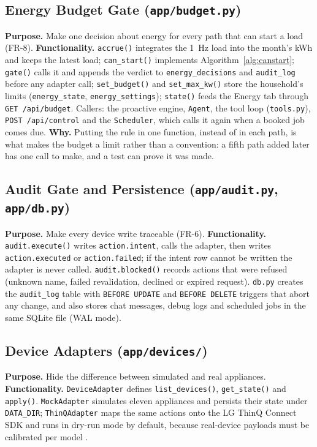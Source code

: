 \documentclass[conference]{IEEEtran}
\begin{document}
\subsection{Energy Budget Gate (\texttt{app/budget.py})}
\textbf{Purpose.} Make one decision about energy for every path that can start a load (FR-8).
\textbf{Functionality.} \texttt{accrue()} integrates the 1~Hz load into the month's kWh and keeps the latest load; \texttt{can\_start()} implements Algorithm~\ref{alg:canstart}; \texttt{gate()} calls it and appends the verdict to \texttt{energy\_decisions} and \texttt{audit\_log} before any adapter call; \texttt{set\_budget()} and \texttt{set\_max\_kw()} store the household's limits (\texttt{energy\_state}, \texttt{energy\_settings}); \texttt{state()} feeds the Energy tab through \texttt{GET /api/budget}. Callers: the proactive engine, \texttt{Agent}, the tool loop (\texttt{tools.py}), \texttt{POST /api/control} and the \texttt{Scheduler}, which calls it again when a booked job comes due.
\textbf{Why.} Putting the rule in one function, instead of in each path, is what makes the budget a limit rather than a convention: a fifth path added later has one call to make, and a test can prove it was made.

\subsection{Audit Gate and Persistence (\texttt{app/audit.py}, \texttt{app/db.py})}
\textbf{Purpose.} Make every device write traceable (FR-6).
\textbf{Functionality.} \texttt{audit.execute()} writes \texttt{action.intent}, calls the adapter, then writes \texttt{action.executed} or \texttt{action.failed}; if the intent row cannot be written the adapter is never called. \texttt{audit.blocked()} records actions that were refused (unknown name, failed revalidation, declined or expired request). \texttt{db.py} creates the \texttt{audit\_log} table with \texttt{BEFORE UPDATE} and \texttt{BEFORE DELETE} triggers that abort any change, and also stores chat messages, debug logs and scheduled jobs in the same SQLite file (WAL mode).

\subsection{Device Adapters (\texttt{app/devices/})}
\textbf{Purpose.} Hide the difference between simulated and real appliances.
\textbf{Functionality.} \texttt{DeviceAdapter} defines \texttt{list\_devices()}, \texttt{get\_state()} and \texttt{apply()}. \texttt{MockAdapter} simulates eleven appliances and persists their state under \texttt{DATA\_DIR}; \texttt{ThinQAdapter} maps the same actions onto the LG ThinQ Connect SDK and runs in dry-run mode by default, because real-device payloads must be calibrated per model \cite{lgspec2026}.
\end{document}
